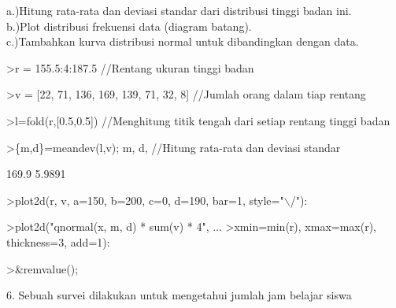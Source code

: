 \documentclass[a4paper,10pt]{article}
\begin{document}
\begin{eulernotebook}
\begin{eulercomment}
\begin{eulercomment}
\begin{eulercomment}
\begin{eulercomment}
\begin{eulercomment}
\begin{eulercomment}
\begin{eulercomment}
\begin{eulercomment}
\begin{eulercomment}
\begin{eulercomment}
\begin{eulercomment}
\begin{eulercomment}
\begin{eulercomment}
\begin{eulercomment}
\begin{eulercomment}
\begin{eulercomment}
\begin{eulercomment}
a.)Hitung rata-rata dan deviasi standar dari distribusi tinggi badan
ini.\\
b.)Plot distribusi frekuensi data (diagram batang).\\
c.)Tambahkan kurva distribusi normal untuk dibandingkan dengan data.
\end{eulercomment}
\begin{eulerprompt}
>r = 155.5:4:187.5  //Rentang ukuran tinggi badan
\end{eulerprompt}
\begin{euleroutput}
  [155.5,  159.5,  163.5,  167.5,  171.5,  175.5,  179.5,  183.5,  187.5]
\end{euleroutput}
\begin{eulerprompt}
>v = [22, 71, 136, 169, 139, 71, 32, 8] //Jumlah orang dalam tiap rentang
\end{eulerprompt}
\begin{euleroutput}
  [22,  71,  136,  169,  139,  71,  32,  8]
\end{euleroutput}
\begin{eulerprompt}
>l=fold(r,[0.5,0.5])  //Menghitung titik tengah dari setiap rentang tinggi badan
\end{eulerprompt}
\begin{euleroutput}
  [157.5,  161.5,  165.5,  169.5,  173.5,  177.5,  181.5,  185.5]
\end{euleroutput}
\begin{eulerprompt}
>\{m,d\}=meandev(l,v); m, d,  //Hitung rata-rata dan deviasi standar
\end{eulerprompt}
\begin{euleroutput}
  169.9
  5.9891
\end{euleroutput}
\begin{eulerprompt}
>plot2d(r, v, a=150, b=200, c=0, d=190, bar=1, style="\(\backslash\)/"):
\end{eulerprompt}
\begin{eulerprompt}
>plot2d("qnormal(x, m, d) * sum(v) * 4", ...
>xmin=min(r), xmax=max(r), thickness=3, add=1):
\end{eulerprompt}
\begin{eulerprompt}
>&remvalue();
\end{eulerprompt}
\begin{eulercomment}
6. Sebuah survei dilakukan untuk mengetahui jumlah jam belajar siswa

\end{eulercomment}
\end{eulercomment}
\end{eulercomment}
\end{eulercomment}
\end{eulercomment}
\end{eulercomment}
\end{eulercomment}
\end{eulercomment}
\end{eulercomment}
\end{eulercomment}
\end{eulercomment}
\end{eulercomment}
\end{eulercomment}
\end{eulercomment}
\end{eulercomment}
\end{eulercomment}
\end{eulercomment}
\end{eulernotebook}
\end{document}
